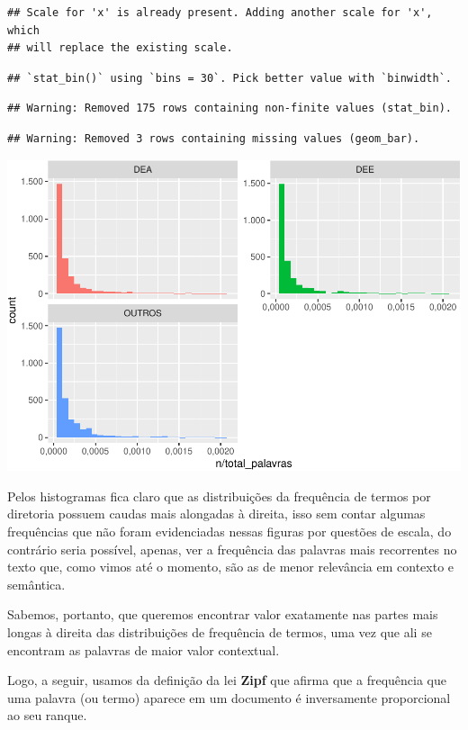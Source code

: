 \documentclass[]{article}
\begin{document}
\begin{verbatim}
## Scale for 'x' is already present. Adding another scale for 'x', which
## will replace the existing scale.
\end{verbatim}

\begin{verbatim}
## `stat_bin()` using `bins = 30`. Pick better value with `binwidth`.
\end{verbatim}

\begin{verbatim}
## Warning: Removed 175 rows containing non-finite values (stat_bin).
\end{verbatim}

\begin{verbatim}
## Warning: Removed 3 rows containing missing values (geom_bar).
\end{verbatim}

\includegraphics{markdown_v41_test_files/figure-latex/unnamed-chunk-29-1.pdf}

Pelos histogramas fica claro que as distribuições da frequência de
termos por diretoria possuem caudas mais alongadas à direita, isso sem
contar algumas frequências que não foram evidenciadas nessas figuras por
questões de escala, do contrário seria possível, apenas, ver a
frequência das palavras mais recorrentes no texto que, como vimos até o
momento, são as de menor relevância em contexto e semântica.

Sabemos, portanto, que queremos encontrar valor exatamente nas partes
mais longas à direita das distribuições de frequência de termos, uma vez
que ali se encontram as palavras de maior valor contextual.

Logo, a seguir, usamos da definição da lei \textbf{Zipf} que afirma que
a frequência que uma palavra (ou termo) aparece em um documento é
inversamente proporcional ao seu ranque.
\end{document}
